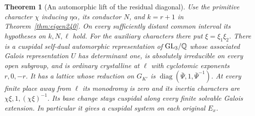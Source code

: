 \documentclass[a4paper,11pt]{article}
\newtheorem{theorem}[proposition]{Theorem}
\theoremstyle{definition}
\theoremstyle{remark}
\numberwithin{equation}{section}
\begin{document}
\begin{theorem}[An automorphic lift of the residual diagonal]
\label{thm:adjoint240}
Use the primitive character \(\chi\) inducing \(\eta\alpha\),
its conductor \(N\), and \(k=r+1\) in Theorem~\ref{thm:eigen240}.
On every sufficiently distant common interval its hypotheses
on \(k,N,\ell\) hold. For the auxiliary characters there put
\(\xi=\xi_1\xi_2\). There is a cuspidal self-dual automorphic
representation of \(\mathrm{GL}_3/\mathbb Q\) whose associated
Galois representation \(U\) has determinant one, is absolutely
irreducible on every open subgroup, and is ordinary crystalline
at \(\ell\) with cyclotomic exponents \(r,0,-r\).
It has a lattice whose reduction on \(G_{K'}\) is
\(\operatorname{diag}(\bar\Psi,1,\bar\Psi^{-1})\).
At every finite place away from \(\ell\) its monodromy is zero
and its inertia characters are \(\chi\xi,1,(\chi\xi)^{-1}\).
Its base change stays cuspidal along every finite solvable
Galois extension. In particular it gives a cuspidal system on
each original \(E_x\).
\end{theorem}
\end{document}
